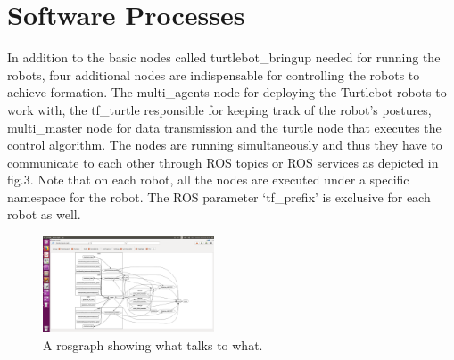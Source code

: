 \documentclass[journal]{IEEEtran}
\begin{document}

\section{Software Processes}

In addition to the basic nodes called turtlebot{\_}bringup needed for running the robots, four additional nodes are indispensable for controlling the robots to achieve formation. 
The multi{\_}agents node for deploying the Turtlebot robots to work with, the tf{\_}turtle responsible for keeping track of the robot's postures, multi{\_}master node for data transmission and the turtle node that executes the control algorithm. The nodes are running simultaneously and thus they have to communicate to each other through ROS topics or ROS services as depicted in fig.3. Note that on each robot, all the nodes are executed under a specific namespace for the robot. The ROS parameter ‘tf{\_}prefix’ is exclusive for each robot as well.

\begin{figure}[!h]
\begin{center}
\includegraphics[width=2in]{4.png}
\caption{A rosgraph showing what talks to what.}
\end{center}
\label{fig2:mypicture2}
\end{figure}
\end{document}
